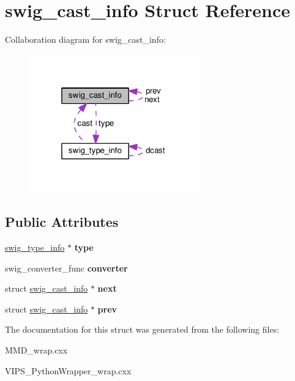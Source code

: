 \hypertarget{structswig__cast__info}{}\section{swig\+\_\+cast\+\_\+info Struct Reference}
\label{structswig__cast__info}


Collaboration diagram for swig\+\_\+cast\+\_\+info\+:
\nopagebreak
\begin{figure}[H]
\begin{center}
\leavevmode
\includegraphics[width=208pt]{structswig__cast__info__coll__graph}
\end{center}
\end{figure}
\subsection*{Public Attributes}
\begin{DoxyCompactItemize}
\item 
\hyperlink{structswig__type__info}{swig\+\_\+type\+\_\+info} $\ast$ {\bfseries type}\hypertarget{structswig__cast__info_a06b74832d16cc0c4fd147e4c39095cd9}{}\label{structswig__cast__info_a06b74832d16cc0c4fd147e4c39095cd9}

\item 
swig\+\_\+converter\+\_\+func {\bfseries converter}\hypertarget{structswig__cast__info_aa630fddfbb1bf9c97a03f9479ba32f76}{}\label{structswig__cast__info_aa630fddfbb1bf9c97a03f9479ba32f76}

\item 
struct \hyperlink{structswig__cast__info}{swig\+\_\+cast\+\_\+info} $\ast$ {\bfseries next}\hypertarget{structswig__cast__info_a2fc1b5702ec07bc23135df5c5db8e53e}{}\label{structswig__cast__info_a2fc1b5702ec07bc23135df5c5db8e53e}

\item 
struct \hyperlink{structswig__cast__info}{swig\+\_\+cast\+\_\+info} $\ast$ {\bfseries prev}\hypertarget{structswig__cast__info_a0f5d1fc81b494c3e032a153609fd3268}{}\label{structswig__cast__info_a0f5d1fc81b494c3e032a153609fd3268}

\end{DoxyCompactItemize}


The documentation for this struct was generated from the following files\+:\begin{DoxyCompactItemize}
\item 
M\+M\+D\+\_\+wrap.\+cxx\item 
V\+I\+P\+S\+\_\+\+Python\+Wrapper\+\_\+wrap.\+cxx\end{DoxyCompactItemize}

